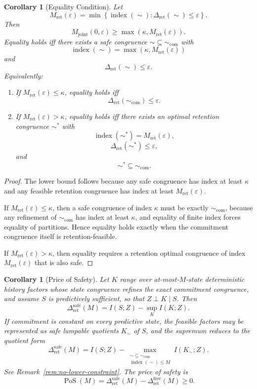 \documentclass[12pt]{article}
\newtheorem{corollary}[theorem]{Corollary}
\theoremstyle{definition}
\begin{document}
\begin{corollary}[Equality Condition]
\label{cor:interaction-equality}
Let
\[
M_{\mathrm{ret}}(\varepsilon)
=
\min
\left\{
\operatorname{index}(\sim):
\Delta_{\mathrm{ret}}(\sim)\le\varepsilon
\right\}.
\]
Then
\[
M_{\mathrm{joint}}(0,\varepsilon)
\ge
\max(\kappa,M_{\mathrm{ret}}(\varepsilon)).
\]
Equality holds iff there exists a safe congruence
$\sim\subseteq\sim_{\mathrm{com}}$ with
\[
\operatorname{index}(\sim)
=
\max(\kappa,M_{\mathrm{ret}}(\varepsilon))
\]
and
\[
\Delta_{\mathrm{ret}}(\sim)\le\varepsilon.
\]
Equivalently:
\begin{enumerate}[label=(\arabic*)]
\item If $M_{\mathrm{ret}}(\varepsilon)\le\kappa$, equality holds iff
\[
\Delta_{\mathrm{ret}}(\sim_{\mathrm{com}})\le\varepsilon.
\]
\item If $M_{\mathrm{ret}}(\varepsilon)>\kappa$, equality holds iff there
exists an optimal retention congruence $\sim^*$ with
\[
\operatorname{index}(\sim^*)=M_{\mathrm{ret}}(\varepsilon),
\]
\[
\Delta_{\mathrm{ret}}(\sim^*)\le\varepsilon,
\]
and
\[
\sim^*\subseteq\sim_{\mathrm{com}}.
\]
\end{enumerate}
\end{corollary}

\begin{proof}
The lower bound follows because any safe congruence has index at least $\kappa$
and any feasible retention congruence has index at least
$M_{\mathrm{ret}}(\varepsilon)$.

If $M_{\mathrm{ret}}(\varepsilon)\le\kappa$, then a safe congruence of index
$\kappa$ must be exactly $\sim_{\mathrm{com}}$, because any refinement of
$\sim_{\mathrm{com}}$ has index at least $\kappa$, and equality of finite index
forces equality of partitions.  Hence equality holds exactly when the
commitment congruence itself is retention-feasible.

If $M_{\mathrm{ret}}(\varepsilon)>\kappa$, then equality requires a retention
optimal congruence of index $M_{\mathrm{ret}}(\varepsilon)$ that is also safe.
\end{proof}

\begin{corollary}[Price of Safety]
\label{cor:price-safety}
Let $K$ range over at-most-$M$-state deterministic history factors whose state
congruence refines the exact commitment congruence, and assume $S$ is
predictively sufficient, so that $Z\perp K\mid S$.  Then
\[
\Delta_{\mathrm{ret}}^{\mathrm{safe}}(M)
=
I(S;Z)
-
\sup_{K}
I(K;Z).
\]
If commitment is constant on every predictive state, the feasible factors may
be represented as safe lumpable quotients $K_\sim$ of $S$, and the supremum
reduces to the quotient form
\[
\Delta_{\mathrm{ret}}^{\mathrm{safe}}(M)
=
I(S;Z)
-
\max_{\substack{
\sim\subseteq\sim_{\mathrm{com}}\\
\operatorname{index}(\sim)\le M
}}
I(K_\sim;Z).
\]
See Remark~\ref{rem:no-lower-constraint}.
The price of safety is
\[
\operatorname{PoS}(M)
=
\Delta_{\mathrm{ret}}^{\mathrm{safe}}(M)
-
\Delta_{\mathrm{ret}}^{\mathrm{free}}(M)
\ge0.
\]
\end{corollary}
\end{document}
